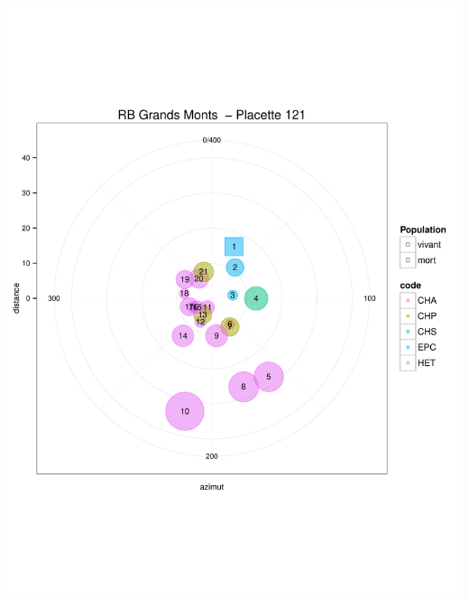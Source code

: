 \documentclass[a4paper]{book}\usepackage[]{graphicx}\usepackage[]{color}
\makeatletter
\def\maxwidth{ %
  \ifdim\Gin@nat@width>\linewidth
    \linewidth
  \else
    \Gin@nat@width
  \fi
}
\newenvironment{knitrout}{}{} %
\makeatother
\begin{document}
\begin{knitrout}
{\centering \includegraphics[width=\maxwidth]{Figures/PlanArbres-4} 

}





\end{knitrout}
\end{document}
